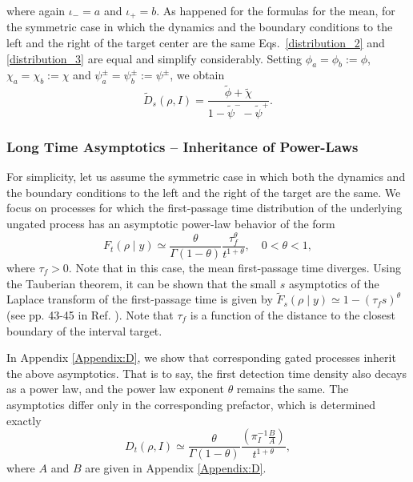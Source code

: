 %
\noindent where again $\iota_- = a$ and $\iota_+ = b$.
%
As happened for the formulas for the mean, for the symmetric case in which the dynamics and the boundary conditions to the left and the right of the target center are the same Eqs.~\eqref{distribution_2} and \eqref{distribution_3} are equal and simplify considerably.  Setting $\phi_a = \phi_b := \phi$, $\chi_a = \chi_b := \chi$ and $\psi^{\pm}_{a} = \psi^{\pm}_{b}:=\psi^{\pm}$, we obtain
%
\begin{equation} \label{distribution_4}
  \widetilde{D}_s(\rho, I)   = \frac{\widetilde{\phi} + \widetilde{\chi}}{1 - \widetilde{\psi}^{-} -\widetilde{\psi}^{+} }.
\end{equation}


\subsubsection{Long Time Asymptotics -- Inheritance of Power-Laws} \label{subsec:long}

For simplicity, let us assume the symmetric case in which both the dynamics and the boundary conditions to the left and the right of the target are the same. We focus on processes for which the first-passage time distribution of the underlying ungated process has an asymptotic power-law behavior of the form 
%
\begin{equation} \label{heavytail}
    F_t(\rho \mid y) \simeq \frac{\theta}{\Gamma(1-\theta)} \frac{\tau_f^{\theta}}{t^{1+\theta}}, \quad 0<\theta<1,
\end{equation}
%
where $\tau_f>0$. Note that in this case, the mean first-passage time diverges. Using the Tauberian theorem, it can be shown that the small $s$ asymptotics of the Laplace transform of the first-passage time is given by $\widetilde{F}_s(\rho \mid y) \simeq1-(\tau_f s)^{\theta}$ (see pp. 43-45 in Ref. \cite{klafter2011first}). Note that $\tau_f$ is a function of the distance to the closest boundary of the interval target.

In Appendix \ref{Appendix:D}, we show that corresponding gated processes inherit the above asymptotics. That is to say, the first detection time density also decays as a power law, and the power law exponent $\theta$ remains the same. The asymptotics differ only in the corresponding prefactor, which is determined exactly
%
\begin{equation} \label{asymptot1}
D_t(\rho, I) \simeq
  \frac{\theta }{\Gamma(1-\theta)} \frac{\left(\pi^{-1}_{I}\frac{B}{A}\right)}{t^{1+\theta}},
\end{equation}
%
where $A$ and $B$ are given in Appendix \ref{Appendix:D}. 

